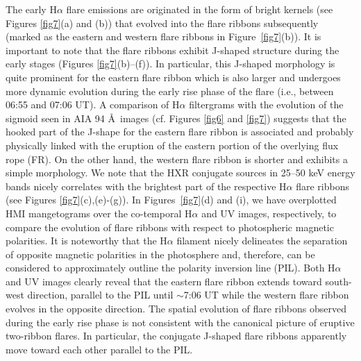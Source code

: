 \documentclass[twocolumn]{aastex6}
\begin{document}
The early H$ \alpha $ flare emissions are originated in the form of bright kernels (see Figures \ref{fig7}(a) and (b)) that evolved into the flare ribbons subsequently (marked as the eastern and western flare ribbons in Figure~\ref{fig7}(b)). It is important to note that the flare ribbons exhibit J-shaped structure during the early stages (Figures \ref{fig7}(b)--(f)). In particular, this J-shaped morphology is quite prominent for the eastern flare ribbon which is also larger and undergoes more dynamic evolution during the early rise phase of the flare (i.e., between 06:55 and 07:06 UT). A comparison of H$\alpha$ filtergrams with the evolution of the sigmoid seen in AIA 94 \AA~images (cf. Figures \ref{fig6} and \ref{fig7}) suggests that the hooked part of the J-shape for the eastern flare ribbon is associated and probably physically linked with the eruption of the eastern portion of the overlying flux rope (FR). On the other hand, the western flare ribbon is shorter and exhibits a simple morphology. We note that the HXR conjugate sources in 25--50 keV energy bands nicely correlates with the brightest part of the respective H$\alpha $ flare ribbons (see Figures \ref{fig7}(c),(e)-(g)). In Figures~\ref{fig7}(d) and (i), we have overplotted HMI mangetograms over the co-temporal H$\alpha$ and UV images, respectively, to compare the evolution of flare ribbons with respect to photospheric magnetic polarities. It is noteworthy that the H$\alpha$ filament nicely delineates the separation of opposite magnetic polarities in the photosphere and, therefore, can be considered to approximately outline the  polarity inversion line (PIL). Both H$\alpha$ and UV images clearly reveal that the eastern flare ribbon extends toward south-west direction, parallel to the PIL until $\sim$7:06 UT while the western flare ribbon evolves in the opposite direction. The spatial evolution of flare ribbons observed during the early rise phase is not consistent with the canonical picture of eruptive two-ribbon flares. In particular, the conjugate J-shaped flare ribbons apparently move toward each other parallel to the PIL.
\end{document}
